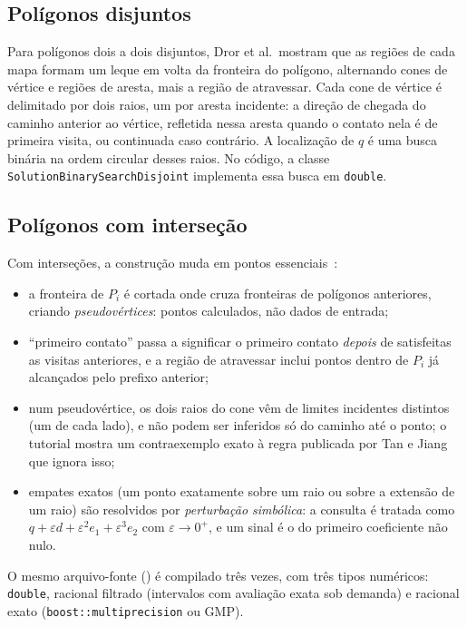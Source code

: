 \documentclass[11pt,a4paper]{article}
\theoremstyle{plain}\newtheorem{proposicao}{Proposição}
\theoremstyle{definition}\newtheorem{definicao}{Definição}
\theoremstyle{plain}\newtheorem{teorema}{Teorema}
\newcommand{\code}[1]{\texttt{\small #1}}
\begin{document}
\subsection{Polígonos disjuntos}
Para polígonos dois a dois disjuntos, Dror et al.\ mostram que as regiões de cada mapa formam um leque em volta da fronteira do polígono, alternando cones de vértice e regiões de aresta, mais a região de atravessar. Cada cone de vértice é delimitado por dois raios, um por aresta incidente: a direção de chegada do caminho anterior ao vértice, refletida nessa aresta quando o contato nela é de primeira visita, ou continuada caso contrário. A localização de \(q\) é uma busca binária na ordem circular desses raios. No código, a classe \code{SolutionBinarySearchDisjoint} implementa essa busca em \texttt{double}.

\subsection{Polígonos com interseção}\label{sec:intersecao}
Com interseções, a construção muda em pontos essenciais~\cite{tutorial,correcao}:
\begin{itemize}[leftmargin=*,itemsep=1pt]
\item a fronteira de \(P_i\) é cortada onde cruza fronteiras de polígonos anteriores, criando \emph{pseudovértices}: pontos calculados, não dados de entrada;
\item ``primeiro contato'' passa a significar o primeiro contato \emph{depois} de satisfeitas as visitas anteriores, e a região de atravessar inclui pontos dentro de \(P_i\) já alcançados pelo prefixo anterior;
\item num pseudovértice, os dois raios do cone vêm de limites incidentes distintos (um de cada lado), e não podem ser inferidos só do caminho até o ponto; o tutorial mostra um contraexemplo exato à regra publicada por Tan e Jiang~\cite{tanjiang} que ignora isso;
\item empates exatos (um ponto exatamente sobre um raio ou sobre a extensão de um raio) são resolvidos por \emph{perturbação simbólica}: a consulta é tratada como \(q+\varepsilon d+\varepsilon^2e_1+\varepsilon^3e_2\) com \(\varepsilon\to0^+\), e um sinal é o do primeiro coeficiente não nulo.
\end{itemize}
O mesmo arquivo-fonte () é compilado três vezes, com três tipos numéricos: \texttt{double}, racional filtrado (intervalos com avaliação exata sob demanda) e racional exato (\code{boost::multiprecision} ou GMP).
\end{document}
